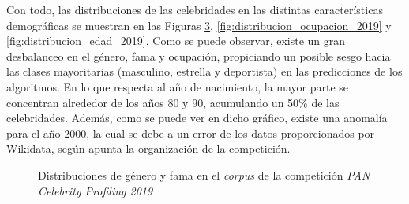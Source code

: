\bigskip
Con todo, las distribuciones de las celebridades en las distintas características demográficas se muestran en las Figuras \ref{fig:distribuciones_genero_fama_2019},
\ref{fig:distribucion_ocupacion_2019} y \ref{fig:distribucion_edad_2019}. Como se puede observar, existe un gran desbalanceo
en el género, fama y ocupación, propiciando un posible sesgo hacia las clases mayoritarias (masculino, estrella y deportista) en las predicciones de los algoritmos.
En lo que respecta al año de nacimiento,
la mayor parte se concentran alrededor de los años 80 y 90, acumulando un 50\% de las celebridades.
Además, como se puede ver en dicho gráfico, existe una anomalía
para el año 2000, la cual se debe a un error de los datos proporcionados por Wikidata, según apunta la organización de la competición.

\bigskip
\begin{figure}[H]
	\centering
	\begin{subfigure}{0.5\textwidth}
		\label{fig:distribucion_genero_2019}
	\end{subfigure}%
	\hfill
	\begin{subfigure}{0.5\textwidth}
		\label{fig:distribucion_fama_2019}
	\end{subfigure}
	\caption{Distribuciones de género y fama en el \textit{corpus} de la competición \textit{PAN Celebrity Profiling 2019}}
	\label{fig:distribuciones_genero_fama_2019}
\end{figure}


